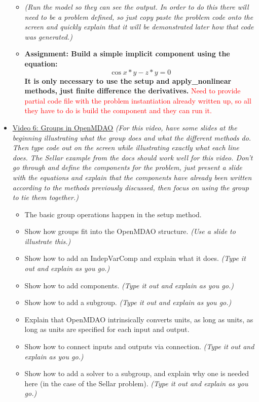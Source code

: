 \documentclass[12pt, letterpaper]{article}
\begin{document}
\begin{itemize}
\begin{itemize}
			\item \textit{(Run the model so they can see the output. In order to do this there will need to be a problem defined, so just copy paste the 				problem code onto the screen and quickly explain that it will be demonstrated later how that code was generated.)}
			\item \textbf{Assignment: Build a simple implicit component using the equation: $$ \cos{x*y}-z*y=0 $$ It is only necessary to use the setup 			and apply\_nonlinear methods, just finite difference the derivatives.} \textcolor{red}{Need to provide partial code file with the problem instantiation already written up, so all they have to do is build the component and they can run it.}
		\end{itemize}

	\item \underline{Video 6: Groups in OpenMDAO} \textit{(For this video, have some slides at the beginning illustrating what the group does 			and what the different methods do. Then type code out on the screen while illustrating exactly what each line does. The Sellar example from the 			docs should work well for this video. Don’t go through and define the components for the problem, just present a slide with the equations and 				explain that the components have already been written according to the methods previously discussed, then focus on using the group to tie them 		together.)}
		\begin{itemize}
			\item The basic group operations happen in the setup method.
			\item Show how groups fit into the OpenMDAO structure. \textit{(Use a slide to illustrate this.)}
			\item Show how to add an IndepVarComp and explain what it does. \textit{(Type it out and explain as you go.)}
			\item Show how to add components. \textit{(Type it out and explain as you go.)}
			\item Show how to add a subgroup. \textit{(Type it out and explain as you go.)}
			\item Explain that OpenMDAO intrinsically converts units, as long as units, as long as units are specified for each input and output.
			\item Show how to connect inputs and outputs via connection. \textit{(Type it out and explain as you go.)}
			\item Show how to add a solver to a subgroup, and explain why one is needed here (in the case of the Sellar problem). \textit{(Type it out and explain as you go.)}

\end{itemize}
\end{itemize}
\end{document}
